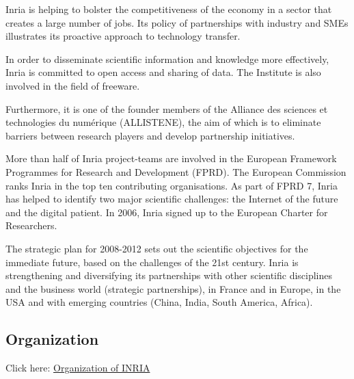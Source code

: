Inria is helping to bolster the competitiveness of the economy in a sector that creates a large number of jobs. Its policy of partnerships with industry and SMEs illustrates its proactive approach to technology transfer.

In order to disseminate scientific information and knowledge more effectively, Inria is committed to open access and sharing of data. The Institute is also involved in the field of freeware.

Furthermore, it is one of the founder members of the Alliance des sciences et technologies du numérique (ALLISTENE), the aim of which is to eliminate barriers between research players and develop partnership initiatives.


More than half of Inria project-teams are involved in the European Framework Programmes for Research and Development (FPRD). The European Commission ranks Inria in the top ten contributing organisations. As part of FPRD 7, Inria has helped to identify two major scientific challenges: the Internet of the future and the digital patient. In 2006, Inria signed up to the European Charter for Researchers.


The strategic plan for 2008-2012 sets out the scientific objectives for the immediate future, based on the challenges of the 21st century. Inria is strengthening and diversifying its partnerships with other scientific disciplines and the business world (strategic partnerships), in France and in Europe, in the USA and with emerging countries (China, India, South America, Africa).

\subsection{Organization}

Click here: \href{http://www.inria.fr/en/institute/organisation}{Organization of INRIA}